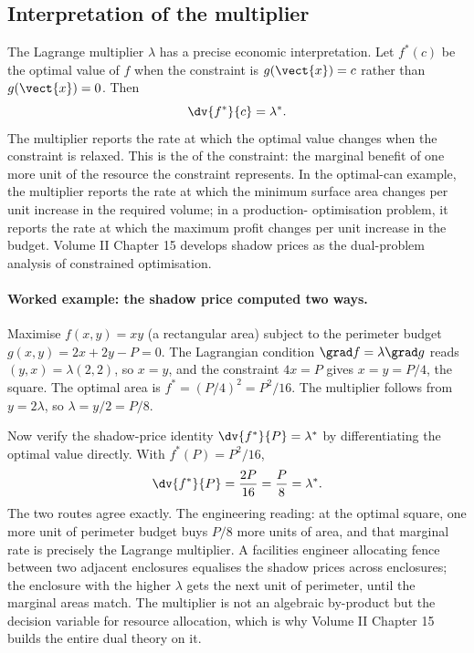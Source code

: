 \subsection{Interpretation of the multiplier}

The Lagrange multiplier $\lambda$ has a precise economic
interpretation. Let $f^{*}(c)$ be the optimal value of $f$ when the
constraint is $g(\vect{x}) = c$ rather than $g(\vect{x}) = 0$. Then
\[
\dv{f^{*}}{c} = \lambda^{*}.
\]
The multiplier reports the rate at which the optimal value changes
when the constraint is relaxed. This is the 
of the constraint: the marginal benefit of one more unit of the
resource the constraint represents. In the optimal-can example, the
multiplier reports the rate at which the minimum surface area
changes per unit increase in the required volume; in a production-
optimisation problem, it reports the rate at which the maximum profit
changes per unit increase in the budget. Volume II Chapter 15
develops shadow prices as the dual-problem analysis of constrained
optimisation.

\paragraph{Worked example: the shadow price computed two ways.}
Maximise $f(x, y) = xy$ (a rectangular area) subject to the perimeter
budget $g(x, y) = 2x + 2y - P = 0$. The Lagrangian condition $\grad
f = \lambda\grad g$ reads $(y, x) = \lambda(2, 2)$, so $x = y$, and
the constraint $4x = P$ gives $x = y = P/4$, the square. The optimal
area is $f^{*} = (P/4)^{2} = P^{2}/16$. The multiplier follows from
$y = 2\lambda$, so $\lambda = y/2 = P/8$.

Now verify the shadow-price identity $\dv{f^{*}}{P} = \lambda^{*}$
by differentiating the optimal value directly. With $f^{*}(P) =
P^{2}/16$,
\[
\dv{f^{*}}{P} = \frac{2P}{16} = \frac{P}{8} = \lambda^{*}.
\]
The two routes agree exactly. The engineering reading: at the
optimal square, one more unit of perimeter budget buys $P/8$ more
units of area, and that marginal rate is precisely the Lagrange
multiplier. A facilities engineer allocating fence between two
adjacent enclosures equalises the shadow prices across enclosures;
the enclosure with the higher $\lambda$ gets the next unit of
perimeter, until the marginal areas match. The multiplier is not an
algebraic by-product but the decision variable for resource
allocation, which is why Volume II Chapter 15 builds the entire dual
theory on it.


